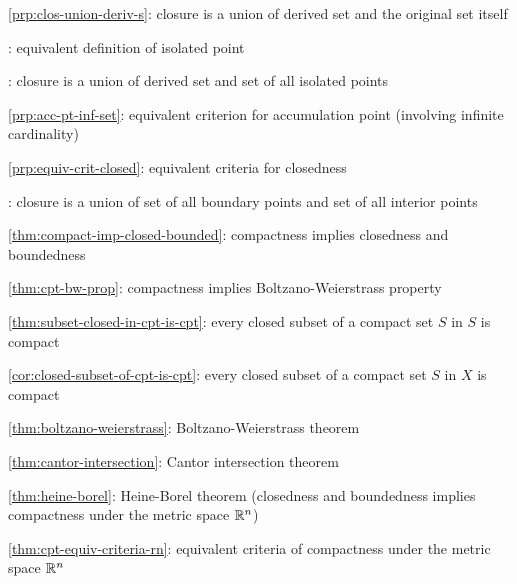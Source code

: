 \item \cref{prp:clos-union-deriv-s}: closure is a union of derived set and the original set itself
\item {}: equivalent definition of isolated point
\item {}: closure is a union of derived set and set of all isolated points
\item \cref{prp:acc-pt-inf-set}: equivalent criterion for accumulation point (involving infinite cardinality)
\item \cref{prp:equiv-crit-closed}: equivalent criteria for closedness
\item {}: closure is a union of set of all boundary points and set of all interior points
\item \cref{thm:compact-imp-closed-bounded}: compactness implies closedness and boundedness
\item \cref{thm:cpt-bw-prop}: compactness implies Boltzano-Weierstrass property
\item \cref{thm:subset-closed-in-cpt-is-cpt}: every closed subset of a compact set \(S\) in \(S\) is compact
\item \cref{cor:closed-subset-of-cpt-is-cpt}: every closed subset of a compact set \(S\) in \(X\) is compact
\item \cref{thm:boltzano-weierstrass}: Boltzano-Weierstrass theorem
\item \cref{thm:cantor-intersection}: Cantor intersection theorem
\item \cref{thm:heine-borel}: Heine-Borel theorem (closedness and boundedness
implies compactness under the metric space \(\mathbb{R}^n\))
\item \cref{thm:cpt-equiv-criteria-rn}: equivalent criteria of compactness
under the metric space \(\mathbb{R}^n\)
